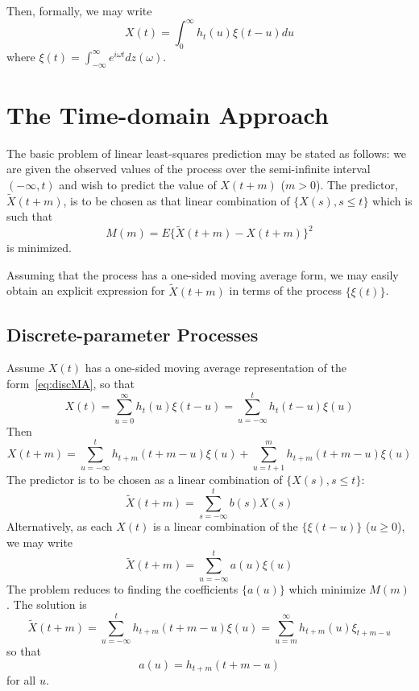 \documentclass[11pt]{article}
\begin{document}
Then, formally, we may write
\begin{equation}
X(t) = \int_0^{\infty} h_t(u) \xi(t-u) du
\label{eq:contMA}
\end{equation}
where $\xi(t) = \int_{-\infty}^{\infty} e^{i\omega t} dz(\omega)$.

\section{The Time-domain Approach}

The basic problem of linear least-squares prediction may be stated as follows: we are given the observed values of the process over the semi-infinite interval $(-\infty, t)$ and wish to predict the value of $X(t+m)$ ($m>0$). The predictor, $\tilde{X}(t+m)$, is to be chosen as that linear combination of $\{X(s), s \leq t\}$ which is such that
\begin{equation}
M(m) = E\{ \tilde{X}(t+m) - X(t+m) \}^2
\label{eq:predvar}
\end{equation}
is minimized.

Assuming that the process has a one-sided moving average form, we may easily obtain an explicit expression for $\tilde{X}(t+m)$ in terms of the process $\{\xi(t)\}$.

\subsection{Discrete-parameter Processes}

Assume $X(t)$ has a one-sided moving average representation of the form~\eqref{eq:discMA}, so that
\begin{equation}
X(t) = \sum_{u=0}^{\infty} h_t(u) \xi(t-u) = \sum_{u=-\infty}^t h_t(t-u) \xi(u)
\label{eq:XtMA}
\end{equation}
Then
\begin{equation}
X(t+m) = \sum_{u=-\infty}^t h_{t+m}(t+m-u) \xi(u) + \sum_{u=t+1}^{m} h_{t+m}(t+m-u) \xi(u)
\label{eq:Xtplusm}
\end{equation}
The predictor is to be chosen as a linear combination of $\{X(s), s \leq t\}$:
\begin{equation}
\tilde{X}(t+m) = \sum_{s=-\infty}^t b(s) X(s)
\label{eq:predX}
\end{equation}
Alternatively, as each $X(t)$ is a linear combination of the $\{\xi(t-u)\}$ ($u \geq 0$), we may write
\begin{equation}
\tilde{X}(t+m) = \sum_{u=-\infty}^t a(u) \xi(u)
\label{eq:predxi}
\end{equation}
The problem reduces to finding the coefficients $\{a(u)\}$ which minimize $M(m)$. The solution is
\begin{equation}
\tilde{X}(t+m) = \sum_{u=-\infty}^t h_{t+m}(t+m-u) \xi(u) = \sum_{u=m}^{\infty} h_{t+m}(u) \xi_{t+m-u}
\label{eq:predsol}
\end{equation}
so that
\begin{equation}
a(u) = h_{t+m}(t+m-u)
\label{eq:au}
\end{equation}
for all $u$.
\end{document}
